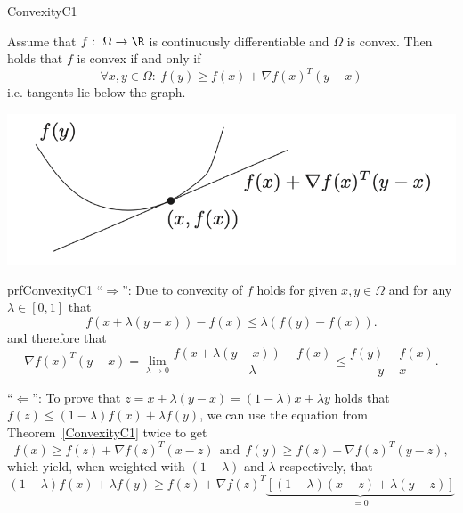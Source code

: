\begin{theo}{ConvexityC1}
    \begin{minipage}{0.60\textwidth}
        Assume that $f: \ \Omega \rightarrow \R$ is continuously differentiable and $\Omega$ is convex. Then holds that $f$ is convex if and only if 
        \begin{equation*}
            \forall x,y \in \Omega: \ f(y) \geq f(x) + \nabla f(x)^T(y-x)
        \end{equation*}
        i\@.e\@. tangents lie below the graph.
    \end{minipage}
    \begin{minipage}{0.3\textwidth}
        \begin{center}
            \includegraphics[scale = 0.45]{Images/Fundamental/C1Convexity.png}
        \end{center}
    \end{minipage}
\end{theo}

\begin{prf}{prfConvexityC1}
    ``$\Rightarrow$'': Due to convexity of $f$ holds for given $x,y \in \Omega$  and for any $\lambda \in [0,1]$ that
    \begin{equation*}
        f(x + \lambda(y-x)) - f(x) \leq \lambda(f(y) - f(x)).
    \end{equation*}
    and therefore that 
    \begin{equation*}
        \nabla f(x)^T(y-x) 
            = \lim_{\lambda \rightarrow 0}  \frac{f(x + \lambda(y-x)) - f(x)}{\lambda}
            \leq \frac{f(y) - f(x)}{y-x}.
    \end{equation*}

    ``$\Leftarrow$'': To prove that $z = x + \lambda(y-x) = (1-\lambda)x + \lambda y$ holds that $f(z) \leq (1-\lambda)f(x) + \lambda f(y)$, we can use the equation from Theorem~\ref{ConvexityC1} twice to get
    \begin{equation*}
        f(x) \geq f(z) + \nabla f(z)^T(x-z) \ \ \text{and} \ \ f(y) \geq f(z) + \nabla f(z)^T(y-z),
    \end{equation*}
    which yield, when weighted with $(1-\lambda)$ and $\lambda$ respectively, that
    \begin{equation*}
        (1-\lambda)f(x) + \lambda f(y) \geq f(z) + \nabla f(z)^T \underset{= 0}{\underbrace{\left[(1-\lambda)(x-z) + \lambda(y-z)\right]}}
    \end{equation*}
    \vspace{-0.75cm}
\end{prf}

